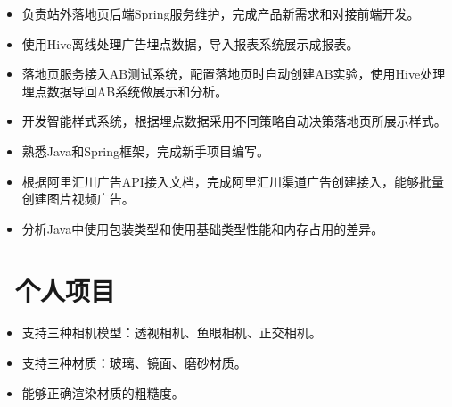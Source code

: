 \documentclass{resume}
\begin{document}

\begin{itemize}
  \item 负责站外落地页后端Spring服务维护，完成产品新需求和对接前端开发。
  \item 使用Hive离线处理广告埋点数据，导入报表系统展示成报表。
  \item 落地页服务接入AB测试系统，配置落地页时自动创建AB实验，使用Hive处理埋点数据导回AB系统做展示和分析。
  \item 开发智能样式系统，根据埋点数据采用不同策略自动决策落地页所展示样式。
\end{itemize}

\begin{itemize}
  \item 熟悉Java和Spring框架，完成新手项目编写。
  \item 根据阿里汇川广告API接入文档，完成阿里汇川渠道广告创建接入，能够批量创建图片视频广告。
  \item 分析Java中使用包装类型和使用基础类型性能和内存占用的差异。
\end{itemize}


\section{\texorpdfstring{\faGithubAlt\ 个人项目}{个人项目}}
\begin{itemize}
  \item 支持三种相机模型：透视相机、鱼眼相机、正交相机。
  \item 支持三种材质：玻璃、镜面、磨砂材质。
  \item 能够正确渲染材质的粗糙度。
\end{itemize}
\end{document}
